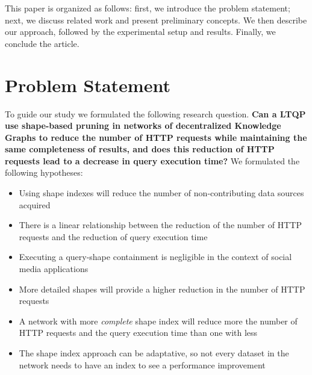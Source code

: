 This paper is organized as follows: first, we introduce the problem statement; next, we discuss related work and present preliminary concepts.
We then describe our approach, followed by the experimental setup and results.
Finally, we conclude the article.

\section{Problem Statement}
To guide our study we formulated the following research question.
\textbf{Can a LTQP use shape-based pruning in networks of decentralized Knowledge Graphs to reduce the number of HTTP requests while maintaining the same completeness of results, and does this reduction of HTTP requests lead to a decrease in query execution time?}
We formulated the following hypotheses:
\setcounter{hypothesisCounter}{1}

\begin{itemize}[label=\textbf{H}\,]
    \item Using shape indexes will reduce the number of non-contributing data sources acquired
    \item There is a linear relationship between the reduction of the number of HTTP requests and the reduction of query execution time
    \item Executing a query-shape containment is negligible in the context of social media applications
    \item More detailed shapes will provide a higher reduction in the number of HTTP requests
    \item A network with more \emph{complete} shape index will reduce more the number of HTTP requests and the query execution time than one with less
    \item The shape index approach can be adaptative, so not every dataset in the network needs to have an index to see a performance improvement
\end{itemize}
